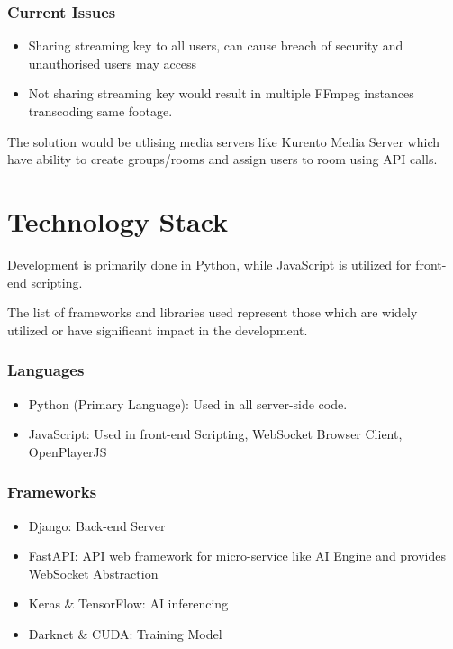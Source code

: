 \subsubsection*{Current Issues}
\begin{itemize}
	\item Sharing streaming key to all users, can cause breach of security and unauthorised users may access 
	\item Not sharing streaming key would result in multiple FFmpeg instances transcoding same footage.
\end{itemize}
The solution would be utlising media servers like Kurento Media Server which have ability to create groups/rooms and assign users to room using API calls.

\section{Technology Stack}
Development is primarily done in Python, while JavaScript is utilized for front-end scripting.

The list of frameworks and libraries used represent those which are widely utilized or have significant impact in the development.

\subsubsection*{Languages}
\begin{itemize}
	\item Python (Primary Language): Used in all server-side code.
	\item JavaScript: Used in front-end Scripting, WebSocket Browser Client, OpenPlayerJS
\end{itemize}

\subsubsection*{Frameworks}
\begin{itemize}
	\item Django: Back-end Server
	\item FastAPI: API web framework for micro-service like AI Engine and provides WebSocket Abstraction
	\item Keras \& TensorFlow: AI inferencing
	\item Darknet \& CUDA: Training Model
\end{itemize}

